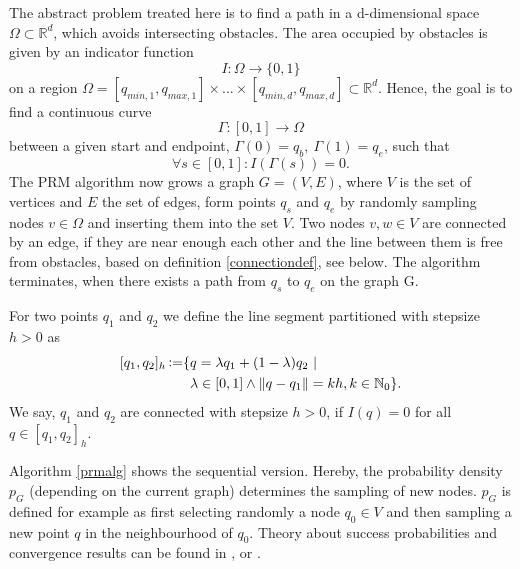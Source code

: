 \documentclass[twocolumn]{svjour3}
\DeclareMathOperator*{\defgl}{\vcentcolon=}
\newcommand{\R}{\mathbb{R}}
\newcommand{\N}{\mathbb{N}}
\newcommand{\norm}[1]{\left\lVert#1\right\rVert}
\begin{document}
The abstract problem treated here is to find a path in a d-dimensional space $\Omega \subset \R^d$, which avoids intersecting obstacles. The area occupied by obstacles is given by an indicator function
\begin{equation}
	I: \Omega \rightarrow \{0, 1\}
\end{equation}
on a region \( \Omega = [ q_{min,1}, q_{max,1} ] \times ... \times  [ q_{min,d}, q_{max,d} ] \subset \R^d  \). Hence, the goal is to find a continuous curve
\begin{equation}
	\Gamma: [0,1] \rightarrow \Omega
\end{equation}
between a given start and endpoint, \(\Gamma(0)=q_b,\ \Gamma(1)=q_e \), 
such that
\begin{equation}
	\forall s\in [0,1]: I(\Gamma(s))=0 .
\end{equation}
The PRM algorithm now grows a graph \(G=(V,E)\), where $V$ is the set of vertices and $E$ the set of edges,
 form points \(q_s\) and \(q_e\) by randomly sampling nodes \(v\in \Omega\) and inserting them into the set $V$.  
 Two nodes \(v,w \in V\) are connected by an edge, if they are near enough each other and the line between them is free from obstacles, based on definition \ref{connectiondef}, see below. 
 The algorithm terminates, when there exists a path from \(q_s\) to \(q_e\) on the graph G.

\begin{definition}\label{connectiondef}
For two points \(q_1\) and \(q_2\) we define the line segment partitioned with stepsize \(h>0\) as
	\begin{equation}
	\begin{aligned}
		[q_1,q_2]_h \defgl \{ &q = \lambda q_1+(1-\lambda) q_2\ | \\ 
				& \lambda \in [0,1] \land \norm{q-q_1} = k h, k \in \N_0 \}.
	\end{aligned}
	\end{equation}
	We say, \(q_1\) and \(q_2\) are connected with stepsize \(h>0\), if
	\(I(q)=0\) for all \(q \in [q_1, q_2]_h\).
\end{definition}

Algorithm \ref{prmalg} shows the sequential version. Hereby, the probability density \(p_G\) (depending on the current graph) determines the sampling of new nodes. $p_G$ is defined for example as first selecting randomly a node \(q_0 \in V\) and then sampling a new point \(q\) in the neighbourhood of \(q_0\). 
Theory about success probabilities and convergence results can be found in \cite{prmlec}, \cite{prm1} or \cite{prm2}.
\end{document}
